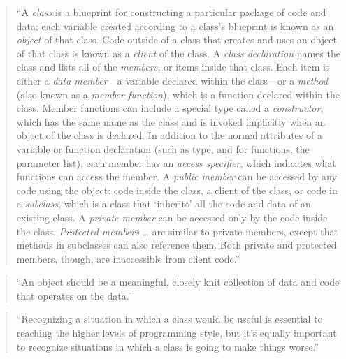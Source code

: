 \documentclass[]{tufte-book}
\begin{document}
\begin{quote}
``A \emph{class} is a blueprint for constructing a particular package of code and data; each
variable created according to a class's blueprint is known as an \emph{object} of that class.
Code outside of a class that creates and uses an object of that class is known as a \emph{client}
of the class. A \emph{class declaration} names the class and lists all of the \emph{members}, or
items inside that class. Each item is either a \emph{data member}---a variable declared within the
class---or a \emph{method} (also known as a \emph{member function}), which is a function declared within
the class. Member functions can include a special type called a \emph{constructor}, which has the
same name as the class and is invoked implicitly when an object of the class is declared.
In addition to the normal attributes of a variable or function declaration (such as type, and
for functions, the parameter list), each member has an \emph{access specifier}, which indicates
what functions can access the member. A \emph{public member} can be accessed by any code using the
object: code inside the class, a client of the class, or code in a \emph{subclass}, which is a class
that `inherits' all the code and data of an existing class. A \emph{private member} can be
accessed only by the code inside the class. \emph{Protected members} \ldots{} are similar to private
members, except that methods in subclasses can also reference them. Both private and
protected members, though, are inaccessible from client code.'' \citep{spraul2012think}
\end{quote}

\begin{quote}
``An object should be a meaningful, closely knit collection of data and code that operates
on the data.'' \citep{spraul2012think}
\end{quote}

\begin{quote}
``Recognizing a situation in which a class would be useful is essential to reaching the
higher levels of programming style, but it's equally important to recognize situations in
which a class is going to make things worse.'' \citep{spraul2012think}
\end{quote}
\end{document}

